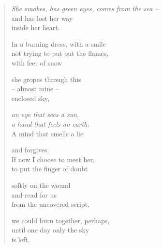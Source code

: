 \begin{verse}

\emph{She smokes, has green eyes, comes from the sea --}\\
and has lost her way\\
inside her heart.

In a burning dress, with a smile\\
not trying to put out the flames,\\
with feet of snow

she gropes through this\\
-- almost mine --\\
enclosed sky,

\emph{an eye that sees a sun,\\
a hand that feels an earth.}\\
A mind that smells a lie

and forgives.\\
If now I choose to meet her,\\
to put the finger of doubt

softly on the wound\\
and read for us\\
from the uncovered script,

we could burn together, perhaps,\\
until one day only the sky\\
is left.

\end{verse}

